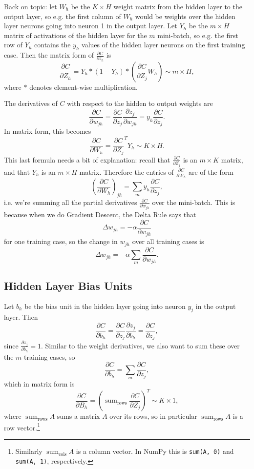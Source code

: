 \documentclass[12pt]{article}
\theoremstyle{plain}
\theoremstyle{definition}
\theoremstyle{remark}
\DeclareMathOperator*{\sumtext}{sum}
\begin{document}
Back on topic: let $W_h$ be the $K \times H$ weight matrix from the hidden layer to the output layer, so e.g. the first column of $W_h$ would be weights over the hidden layer neurons going into neuron 1 in the output layer. Let $Y_h$ be the $m\times H$ matrix of activations of the hidden layer for the $m$ mini-batch, so e.g. the first row of $Y_h$ contains the $y_h$ values of the hidden layer neurons on the first training case. Then the matrix form of $\frac{\partial C}{\partial z_h}$ is
$$\frac{\partial C}{\partial Z_h} = Y_h * (1 - Y_h) * \left(\frac{\partial C}{\partial Z_j}W_h\right) \sim m \times H,$$
where $*$ denotes element-wise multiplication.

The derivatives of $C$ with respect to the hidden to output weights are
$$\frac{\partial C}{\partial w_{jh}} = \frac{\partial C}{\partial z_j} \frac{\partial z_j}{\partial w_{jh}} = y_h \frac{\partial C}{\partial z_j}.$$
In matrix form, this becomes
$$\frac{\partial C}{\partial W_h} = \frac{\partial C}{\partial Z_j}^T Y_h \sim K \times H.$$
This last formula needs a bit of explanation: recall that $\frac{\partial C}{\partial Z_j}$ is an $m\times K$ matrix, and that $Y_h$ is an $m\times H$ matrix. Therefore the entries of $\frac{\partial C}{\partial W_h}$ are of the form 
$$\left(\frac{\partial C}{\partial W_h}\right)_{jh} = \sum_m y_h \frac{\partial C}{\partial z_j},$$
i.e. we're summing all the partial derivatives $\frac{\partial C}{\partial w_{jh}}$ over the mini-batch. This is because when we do Gradient Descent, the Delta Rule says that
$$\Delta w_{jh} = - \alpha \frac{\partial C}{\partial w_{jh}}$$
for one training case, so the change in $w_{jh}$ over all training cases is
$$\Delta w_{jh} = - \alpha \sum_m \frac{\partial C}{\partial w_{jh}}.$$

\subsection{Hidden Layer Bias Units}

Let $b_h$ be the bias unit in the hidden layer going into neuron $y_j$ in the output layer. Then 
$$\frac{\partial C}{\partial b_h} = \frac{\partial C}{\partial z_j} \frac{\partial z_j}{\partial b_h} = \frac{\partial C}{\partial z_j},$$
since $\frac{\partial z_j}{\partial b_h} = 1.$ Similar to the weight derivatives, we also want to sum these over the $m$ training cases, so
$$\frac{\partial C}{\partial b_h} = \sum_m \frac{\partial C}{\partial z_j},$$ which in matrix form is
$$\frac{\partial C}{\partial B_h} = \left(\sumtext_\text{rows}\frac{\partial C}{\partial Z_j}\right)^T \sim K \times 1,$$
where $\sumtext_\text{rows} A$ sums a matrix $A$ over its rows, so in particular $\sumtext_\text{rows} A$ is a row vector.\footnote{Similarly $\sumtext_\text{cols} A$ is a column vector. In NumPy this is \lstinline|sum(A, 0)| and \lstinline|sum(A, 1)|, respectively.}
\end{document}
